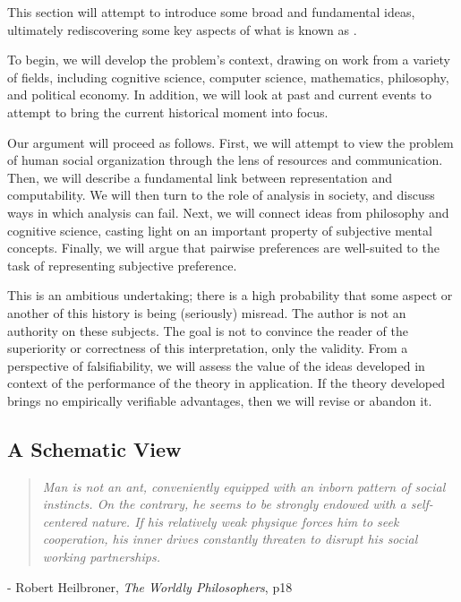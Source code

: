
This section will attempt to introduce some broad and fundamental ideas, ultimately rediscovering some key aspects of what is known as .

To begin, we will develop the problem's context, drawing on work from a variety of fields, including cognitive science, computer science, mathematics, philosophy, and political economy.
In addition, we will look at past and current events to attempt to bring the current historical moment into focus.

\bigskip

Our argument will proceed as follows.
First, we will attempt to view the problem of human social organization through the lens of resources and communication.
Then, we will describe a fundamental link between representation and computability.
We will then turn to the role of analysis in society, and discuss ways in which analysis can fail.
Next, we will connect ideas from philosophy and cognitive science, casting light on an important property of subjective mental concepts.
Finally, we will argue that pairwise preferences are well-suited to the task of representing subjective preference.

\bigskip

This is an ambitious undertaking; there is a high probability that some aspect or another of this history is being (seriously) misread.
The author is not an authority on these subjects.
The goal is not to convince the reader of the superiority or correctness of this interpretation, only the validity.
From a perspective of falsifiability, we will assess the value of the ideas developed in context of the performance of the theory in application.
If the theory developed brings no empirically verifiable advantages, then we will revise or abandon it.

\subsection{A Schematic View}

\begin{center}
\begin{quotation}
\textit{	Man is not an ant, conveniently equipped with an inborn pattern of social instincts.
	On the contrary, he seems to be strongly endowed with a self-centered nature.
	If his relatively weak physique forces him to seek cooperation, his inner drives constantly threaten to disrupt his social working partnerships.}
\end{quotation}
	- Robert Heilbroner, \textit{The Worldly Philosophers}, p18
\end{center}

